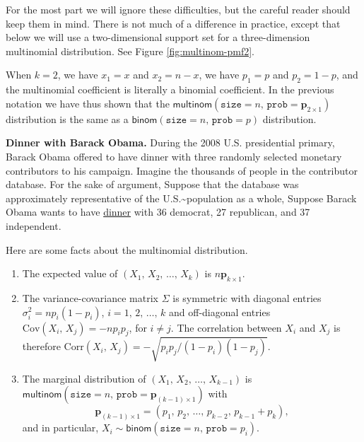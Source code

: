 \documentclass[captions=tableheading]{scrbook}
\begin{document}
For the most part we will ignore these difficulties, but the careful reader should keep them in mind. There is not much of a difference in practice, except that below we will use a two-dimensional support set for a three-dimension multinomial distribution. See Figure \ref{fig:multinom-pmf2}.

When \(k=2\), we have \(x_{1}=x\) and \(x_{2}=n-x\), we have \(p_{1}=p\) and \(p_{2}=1-p\), and the multinomial coefficient is literally a binomial coefficient. In the previous notation we have thus shown that the \(\mathsf{multinom}(\mathtt{size}=n,\,\mathtt{prob}=\mathbf{p}_{2\times1})\) distribution is the same as a \(\mathsf{binom}(\mathtt{size}=n,\,\mathtt{prob}=p)\) distribution.

\begin{example}
\textbf{Dinner with Barack Obama.} During the 2008 U.S. presidential primary, Barack Obama offered to have dinner with three randomly selected monetary contributors to his campaign. Imagine the thousands of people in the contributor database. For the sake of argument, Suppose that the database was approximately representative of the U.S.\~{}population as a whole, Suppose Barack Obama wants to have \href{http://pewresearch.org/pubs/773/fewer-voters-identify-as-republicans}{dinner} with 36 democrat, 27 republican, and 37 independent.
\end{example}

\begin{rem}
Here are some facts about the multinomial distribution.
\begin{enumerate}
\item The expected value of \((X_{1},\, X_{2},\,\ldots,\, X_{k})\) is \(n\mathbf{p}_{k\times1}\).
\item The variance-covariance matrix \(\Sigma\) is symmetric with diagonal entries \(\sigma_{i}^{2}=np_{i}(1-p_{i})\), \(i=1,\,2,\,\ldots,\, k\) and off-diagonal entries \(\mbox{Cov}(X_{i},\, X_{j})=-np_{i}p_{j}\), for \(i\neq j\). The correlation between \(X_{i}\) and \(X_{j}\) is therefore \(\mbox{Corr}(X_{i},\, X_{j})=-\sqrt{p_{i}p_{j}/(1-p_{i})(1-p_{j})}\).
\item The marginal distribution of \((X_{1},\, X_{2},\,\ldots,\, X_{k-1})\) is \(\mathsf{multinom}(\mathtt{size}=n,\,\mathtt{prob}=\mathbf{p}_{(k-1)\times1})\) with
   \begin{equation}
   \mathbf{p}_{(k-1)\times1}=\left(p_{1},\, p_{2},\,\ldots,\, p_{k-2},\, p_{k-1}+p_{k}\right),
   \end{equation}
   and in particular, \(X_{i}\sim\mathsf{binom}(\mathtt{size}=n,\,\mathtt{prob}=p_{i})\).
\end{enumerate}
\end{rem}
\end{document}
